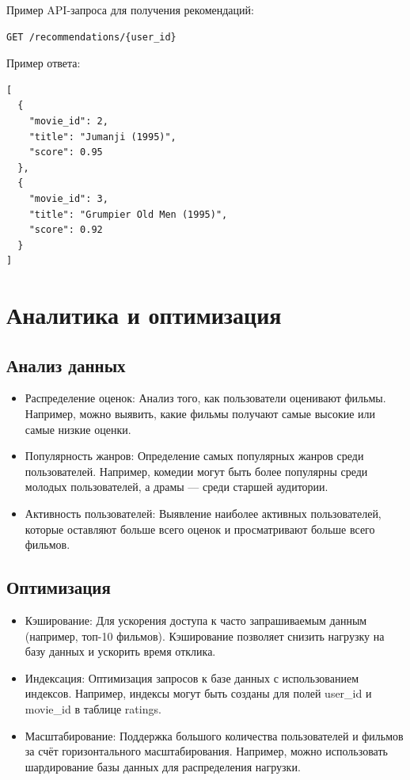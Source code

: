 Пример API-запроса для получения рекомендаций:
\begin{verbatim}
GET /recommendations/{user_id}
\end{verbatim}

Пример ответа:
\begin{verbatim}
[
  {
    "movie_id": 2,
    "title": "Jumanji (1995)",
    "score": 0.95
  },
  {
    "movie_id": 3,
    "title": "Grumpier Old Men (1995)",
    "score": 0.92
  }
]
\end{verbatim}

\section{Аналитика и оптимизация}

\subsection*{Анализ данных}
\begin{itemize}
    \item Распределение оценок: Анализ того, как пользователи оценивают фильмы. Например, можно выявить, какие фильмы получают самые высокие или самые низкие оценки.
    \item Популярность жанров: Определение самых популярных жанров среди пользователей. Например, комедии могут быть более популярны среди молодых пользователей, а драмы — среди старшей аудитории.
    \item Активность пользователей: Выявление наиболее активных пользователей, которые оставляют больше всего оценок и просматривают больше всего фильмов.
\end{itemize}

\subsection*{Оптимизация}
\begin{itemize}
    \item Кэширование: Для ускорения доступа к часто запрашиваемым данным (например, топ-10 фильмов). Кэширование позволяет снизить нагрузку на базу данных и ускорить время отклика.
    \item Индексация: Оптимизация запросов к базе данных с использованием индексов. Например, индексы могут быть созданы для полей user\_id и movie\_id в таблице ratings.
    \item Масштабирование: Поддержка большого количества пользователей и фильмов за счёт горизонтального масштабирования. Например, можно использовать шардирование базы данных для распределения нагрузки.
\end{itemize}

